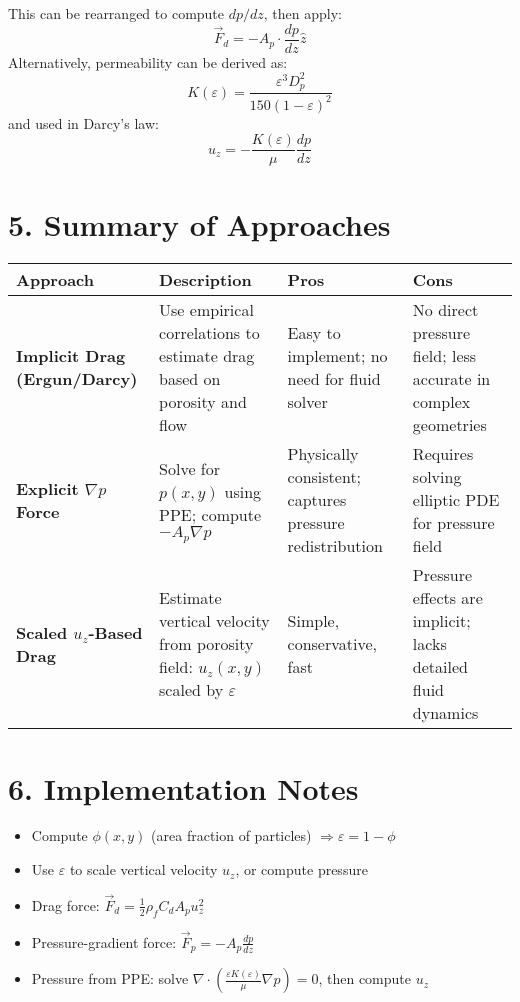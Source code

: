 \documentclass[12pt]{article}
\begin{document}
This can be rearranged to compute \( dp/dz \), then apply:
\[
\boxed{ \vec{F}_d = -A_p \cdot \frac{dp}{dz} \hat{z} }
\]
Alternatively, permeability can be derived as:
\[
K(\varepsilon) = \frac{\varepsilon^3 D_p^2}{150 (1 - \varepsilon)^2}
\]
and used in Darcy’s law:
\[
u_z = -\frac{K(\varepsilon)}{\mu} \frac{dp}{dz}
\]

\section*{5. Summary of Approaches}

\renewcommand{\arraystretch}{1.4}
\begin{table}[H]
\centering
\begin{tabular}{|p{3.8cm}|p{5.5cm}|p{3.5cm}|p{3.5cm}|}
\hline
\textbf{Approach} & \textbf{Description} & \textbf{Pros} & \textbf{Cons} \\
\hline
\textbf{Implicit Drag (Ergun/Darcy)} & Use empirical correlations to estimate drag based on porosity and flow & Easy to implement; no need for fluid solver & No direct pressure field; less accurate in complex geometries \\
\hline
\textbf{Explicit \( \nabla p \) Force} & Solve for \( p(x, y) \) using PPE; compute \( -A_p \nabla p \) & Physically consistent; captures pressure redistribution & Requires solving elliptic PDE for pressure field \\
\hline
\textbf{Scaled \( u_z \)-Based Drag} & Estimate vertical velocity from porosity field: \( u_z(x, y) \) scaled by \( \varepsilon \) & Simple, conservative, fast & Pressure effects are implicit; lacks detailed fluid dynamics \\
\hline
\end{tabular}
\end{table}

\section*{6. Implementation Notes}
\begin{itemize}
    \item Compute \( \phi(x, y) \) (area fraction of particles) \( \Rightarrow \varepsilon = 1 - \phi \)
    \item Use \( \varepsilon \) to scale vertical velocity \( u_z \), or compute pressure
    \item Drag force: \( \vec{F}_d = \frac{1}{2} \rho_f C_d A_p u_z^2 \)
    \item Pressure-gradient force: \( \vec{F}_p = -A_p \frac{dp}{dz} \)
    \item Pressure from PPE: solve \( \nabla \cdot \left( \frac{\varepsilon K(\varepsilon)}{\mu} \nabla p \right) = 0 \), then compute \( u_z \)
\end{itemize}
\end{document}
